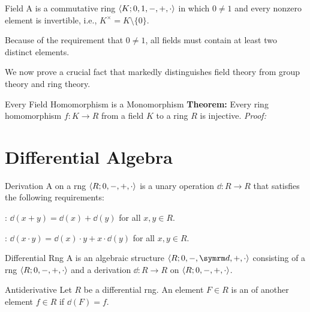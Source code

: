 \documentclass[12pt]{report}
\begin{document}
\begin{dfnbox}{Field}
	A  is a commutative ring ${\langle {K; 0, 1, -, +, \cdot} \rangle}$ in which $0 \ne 1$ and every nonzero element is invertible, i.e., $K^\times = K \setminus \{0\}$.
\end{dfnbox}

Because of the requirement that $0 \ne 1$, all fields must contain at least two distinct elements.

We now prove a crucial fact that markedly distinguishes field theory from group theory and ring theory.

\begin{thmbox}{Every Field Homomorphism is a Monomorphism}
	\textbf{Theorem:} Every ring homomorphism $f: K \to R$ from a field $K$ to a ring $R$ is injective.
\tcblower
	\textit{Proof:}
\end{thmbox}



\chapter{Differential Algebra}

\begin{dfnbox}{Derivation}
	A  on a rng ${\langle {R; 0, -, +, \cdot} \rangle}$ is a unary operation $\dd: R \to R$ that satisfies the following requirements:
	\begin{dfnitems}
		\item {}: $\dd(x + y) = \dd(x) + \dd(y)$ for all $x, y \in R$.
		\item {}: $\dd(x \cdot y) = \dd(x) \cdot y + x \cdot \dd(y)$ for all $x, y \in R$.
	\end{dfnitems}
\end{dfnbox}

\begin{dfnbox}{Differential Rng}
	A  is an algebraic structure $\alg{R; 0, -, \dd, +, \cdot}$ consisting of a rng ${\langle {R; 0, -, +, \cdot} \rangle}$ and a derivation $\dd: R \to R$ on ${\langle {R; 0, -, +, \cdot} \rangle}$.
\end{dfnbox}

\begin{dfnbox}{Antiderivative}
	Let $R$ be a differential rng. An element $F \in R$ is an  of another element $f \in R$ if $\dd(F) = f$.
\end{dfnbox}
\end{document}
